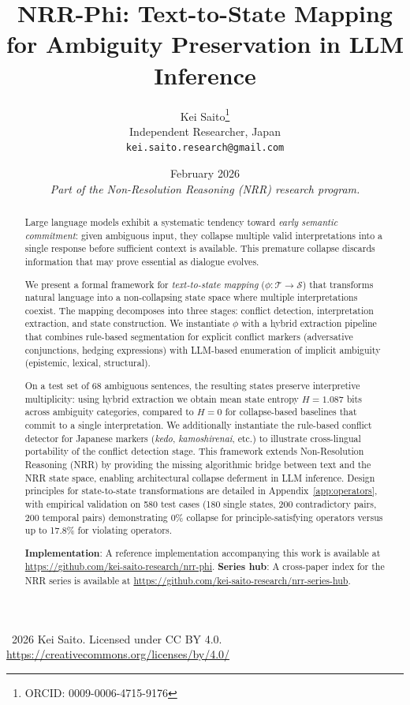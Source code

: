 \documentclass[11pt,a4paper]{article}
\title{\textbf{NRR-Phi: Text-to-State Mapping for Ambiguity Preservation in LLM Inference}}
\author{
  Kei Saito\thanks{ORCID: 0009-0006-4715-9176} \\
  Independent Researcher, Japan \\
  \texttt{kei.saito.research@gmail.com}
}
\date{February 2026 \\[0.5em]
\textit{Part of the Non-Resolution Reasoning (NRR) research program.}}
\begin{document}
\maketitle

\begin{center}
\textcopyright\ 2026 Kei Saito.
Licensed under CC BY 4.0.\\
\url{https://creativecommons.org/licenses/by/4.0/}
\end{center}

\begin{abstract}
Large language models exhibit a systematic tendency toward \textit{early semantic commitment}: 
given ambiguous input, they collapse multiple valid interpretations into a single response 
before sufficient context is available. This premature collapse discards information that 
may prove essential as dialogue evolves.

We present a formal framework for \textit{text-to-state mapping} ($\phi: \mathcal{T} \to \mathcal{S}$) 
that transforms natural language into a non-collapsing state space where multiple interpretations 
coexist. The mapping decomposes into three stages: conflict detection, interpretation extraction, 
and state construction. We instantiate $\phi$ with a hybrid extraction pipeline that combines 
rule-based segmentation for explicit conflict markers (adversative conjunctions, hedging expressions) 
with LLM-based enumeration of implicit ambiguity (epistemic, lexical, structural).

On a test set of 68 ambiguous sentences, the resulting states preserve interpretive multiplicity: 
using hybrid extraction we obtain mean state entropy $H = 1.087$ bits across ambiguity categories, 
compared to $H = 0$ for collapse-based baselines that commit to a single interpretation. 
We additionally instantiate the rule-based conflict detector for Japanese markers 
(\textit{kedo}, \textit{kamoshirenai}, etc.) to illustrate cross-lingual portability of the 
conflict detection stage. This framework extends Non-Resolution Reasoning (NRR) by providing 
the missing algorithmic bridge between text and the NRR state space, enabling architectural 
collapse deferment in LLM inference. Design principles for state-to-state transformations 
are detailed in Appendix~\ref{app:operators}, with empirical validation on 580 test cases 
(180 single states, 200 contradictory pairs, 200 temporal pairs) demonstrating 
0\% collapse for principle-satisfying operators versus up to 17.8\% for violating operators.

\textbf{Implementation}: A reference implementation accompanying this work 
is available at \url{https://github.com/kei-saito-research/nrr-phi}.
\textbf{Series hub}: A cross-paper index for the NRR series is available at
\url{https://github.com/kei-saito-research/nrr-series-hub}.
\end{abstract}
\end{document}
